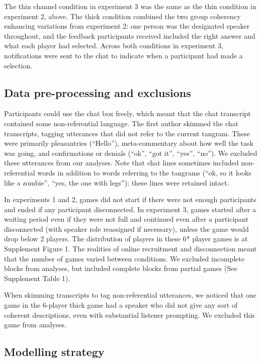 \documentclass[
  english,
  a4paper,
]{article}
\begin{document}
The thin channel condition in experiment 3 was the same as the thin condition in experiment 2, above. The thick condition combined the two group coherency enhancing variations from experiment 2: one person was the designated speaker throughout, and the feedback participants received included the right answer and what each player had selected. Across both conditions in experiment 3, notifications were sent to the chat to indicate when a participant had made a selection.

\hypertarget{data-pre-processing-and-exclusions}{%
\subsection{Data pre-processing and exclusions}\label{data-pre-processing-and-exclusions}}

Participants could use the chat box freely, which meant that the chat transcript contained some non-referential language. The first author skimmed the chat transcripts, tagging utterances that did not refer to the current tangram. These were primarily pleasantries (``Hello''), meta-commentary about how well the task was going, and confirmations or denials (``ok'', ``got it'', ``yes'', ``no''). We excluded these utterances from our analyses. Note that chat lines sometimes included non-referential words in addition to words referring to the tangrams (``ok, so it looks like a zombie'', ``yes, the one with legs''); these lines were retained intact.

In experiments 1 and 2, games did not start if there were not enough participants and ended if any participant disconnected. In experiment 3, games started after a waiting period even if they were not full and continued even after a participant disconnected (with speaker role reassigned if necessary), unless the game would drop below 2 players. The distribution of players in these 6* player games is at Supplement Figure 1. The realities of online recruitment and disconnection meant that the number of games varied between conditions. We excluded incomplete blocks from analyses, but included complete blocks from partial games (See Supplement Table 1).

When skimming transcripts to tag non-referential utterances, we noticed that one game in the 6-player thick game had a speaker who did not give any sort of coherent descriptions, even with substantial listener prompting. We excluded this game from analyses.

\hypertarget{modelling-strategy}{%
\subsection{Modelling strategy}\label{modelling-strategy}}
\end{document}
